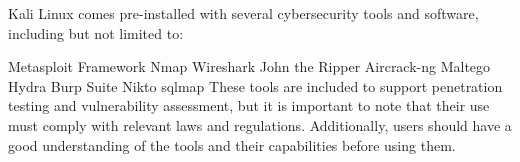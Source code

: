 Kali Linux comes pre-installed with several cybersecurity tools and software, including but not limited to:

Metasploit Framework
Nmap
Wireshark
John the Ripper
Aircrack-ng
Maltego
Hydra
Burp Suite
Nikto
sqlmap
These tools are included to support penetration testing and vulnerability assessment, but it is important to note that their use must comply with relevant laws and regulations. Additionally, users should have a good understanding of the tools and their capabilities before using them.
